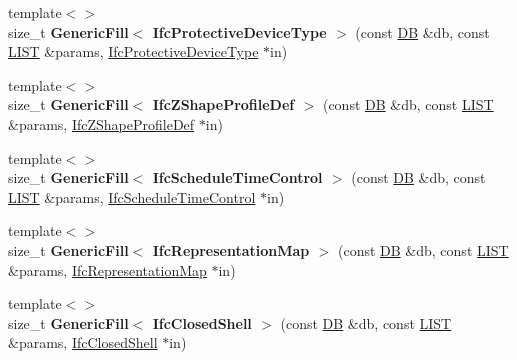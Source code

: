 \begin{DoxyCompactItemize}
\item 
\hypertarget{namespace_assimp_1_1_s_t_e_p_a366448bd3cdb74f1f7e4e0a57d177392}{{\footnotesize template$<$$>$ }\\size\+\_\+t {\bfseries Generic\+Fill$<$ Ifc\+Protective\+Device\+Type $>$} (const \hyperlink{class_assimp_1_1_s_t_e_p_1_1_d_b}{D\+B} \&db, const \hyperlink{class_assimp_1_1_s_t_e_p_1_1_e_x_p_r_e_s_s_1_1_l_i_s_t}{L\+I\+S\+T} \&params, \hyperlink{struct_assimp_1_1_i_f_c_1_1_ifc_protective_device_type}{Ifc\+Protective\+Device\+Type} $\ast$in)}\label{namespace_assimp_1_1_s_t_e_p_a366448bd3cdb74f1f7e4e0a57d177392}

\item 
\hypertarget{namespace_assimp_1_1_s_t_e_p_aa06ffd44c6b09996a223686ca45e435a}{{\footnotesize template$<$$>$ }\\size\+\_\+t {\bfseries Generic\+Fill$<$ Ifc\+Z\+Shape\+Profile\+Def $>$} (const \hyperlink{class_assimp_1_1_s_t_e_p_1_1_d_b}{D\+B} \&db, const \hyperlink{class_assimp_1_1_s_t_e_p_1_1_e_x_p_r_e_s_s_1_1_l_i_s_t}{L\+I\+S\+T} \&params, \hyperlink{struct_assimp_1_1_i_f_c_1_1_ifc_z_shape_profile_def}{Ifc\+Z\+Shape\+Profile\+Def} $\ast$in)}\label{namespace_assimp_1_1_s_t_e_p_aa06ffd44c6b09996a223686ca45e435a}

\item 
\hypertarget{namespace_assimp_1_1_s_t_e_p_af8ea9399677c6c95f485df6c294ec68e}{{\footnotesize template$<$$>$ }\\size\+\_\+t {\bfseries Generic\+Fill$<$ Ifc\+Schedule\+Time\+Control $>$} (const \hyperlink{class_assimp_1_1_s_t_e_p_1_1_d_b}{D\+B} \&db, const \hyperlink{class_assimp_1_1_s_t_e_p_1_1_e_x_p_r_e_s_s_1_1_l_i_s_t}{L\+I\+S\+T} \&params, \hyperlink{struct_assimp_1_1_i_f_c_1_1_ifc_schedule_time_control}{Ifc\+Schedule\+Time\+Control} $\ast$in)}\label{namespace_assimp_1_1_s_t_e_p_af8ea9399677c6c95f485df6c294ec68e}

\item 
\hypertarget{namespace_assimp_1_1_s_t_e_p_aecde3fc031b4a4663ae46f15923f80e9}{{\footnotesize template$<$$>$ }\\size\+\_\+t {\bfseries Generic\+Fill$<$ Ifc\+Representation\+Map $>$} (const \hyperlink{class_assimp_1_1_s_t_e_p_1_1_d_b}{D\+B} \&db, const \hyperlink{class_assimp_1_1_s_t_e_p_1_1_e_x_p_r_e_s_s_1_1_l_i_s_t}{L\+I\+S\+T} \&params, \hyperlink{struct_assimp_1_1_i_f_c_1_1_ifc_representation_map}{Ifc\+Representation\+Map} $\ast$in)}\label{namespace_assimp_1_1_s_t_e_p_aecde3fc031b4a4663ae46f15923f80e9}

\item 
\hypertarget{namespace_assimp_1_1_s_t_e_p_a6272cfe9b0ac2c8f294bd02b7a509133}{{\footnotesize template$<$$>$ }\\size\+\_\+t {\bfseries Generic\+Fill$<$ Ifc\+Closed\+Shell $>$} (const \hyperlink{class_assimp_1_1_s_t_e_p_1_1_d_b}{D\+B} \&db, const \hyperlink{class_assimp_1_1_s_t_e_p_1_1_e_x_p_r_e_s_s_1_1_l_i_s_t}{L\+I\+S\+T} \&params, \hyperlink{struct_assimp_1_1_i_f_c_1_1_ifc_closed_shell}{Ifc\+Closed\+Shell} $\ast$in)}\label{namespace_assimp_1_1_s_t_e_p_a6272cfe9b0ac2c8f294bd02b7a509133}


\end{DoxyCompactItemize}
